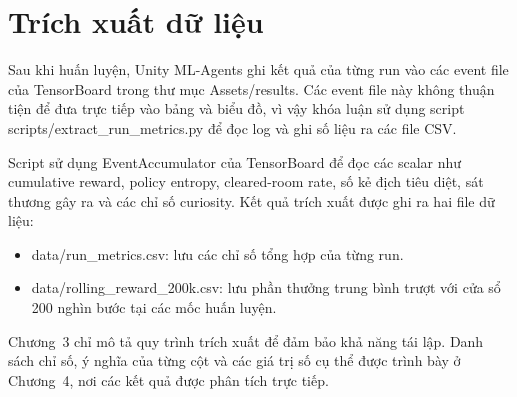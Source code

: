 \section{Trích xuất dữ liệu}

Sau khi huấn luyện, Unity ML-Agents ghi kết quả của từng run vào các event file của TensorBoard trong thư mục Assets/results. Các event file này không thuận tiện để đưa trực tiếp vào bảng và biểu đồ, vì vậy khóa luận sử dụng script scripts/extract\_run\_metrics.py để đọc log và ghi số liệu ra các file CSV.

Script sử dụng EventAccumulator của TensorBoard để đọc các scalar như cumulative reward, policy entropy, cleared-room rate, số kẻ địch tiêu diệt, sát thương gây ra và các chỉ số curiosity. Kết quả trích xuất được ghi ra hai file dữ liệu:

\begin{itemize}
    \item data/run\_metrics.csv: lưu các chỉ số tổng hợp của từng run.
    \item data/rolling\_reward\_200k.csv: lưu phần thưởng trung bình trượt với cửa sổ 200 nghìn bước tại các mốc huấn luyện.
\end{itemize}

Chương~3 chỉ mô tả quy trình trích xuất để đảm bảo khả năng tái lập. Danh sách chỉ số, ý nghĩa của từng cột và các giá trị số cụ thể được trình bày ở Chương~4, nơi các kết quả được phân tích trực tiếp.
